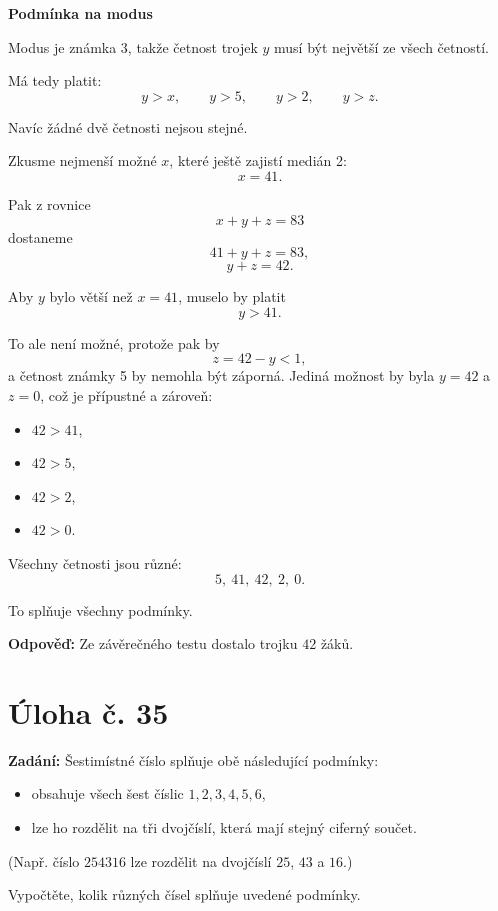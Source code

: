 \documentclass[12pt,a4paper]{article}
\begin{document}
\medskip

\textbf{Podmínka na modus}

Modus je známka \(3\), takže četnost trojek \(y\) musí být největší ze všech četností.

Má tedy platit:
\[
y>x,\qquad y>5,\qquad y>2,\qquad y>z.
\]

Navíc žádné dvě četnosti nejsou stejné.

\medskip

Zkusme nejmenší možné \(x\), které ještě zajistí medián 2:
\[
x=41.
\]

Pak z rovnice
\[
x+y+z=83
\]
dostaneme
\[
41+y+z=83,
\]
\[
y+z=42.
\]

Aby \(y\) bylo větší než \(x=41\), muselo by platit
\[
y>41.
\]

To ale není možné, protože pak by
\[
z=42-y<1,
\]
a četnost známky 5 by nemohla být záporná. Jediná možnost by byla \(y=42\) a \(z=0\), což je přípustné a zároveň:
\begin{itemize}
    \item \(42>41\),
    \item \(42>5\),
    \item \(42>2\),
    \item \(42>0\).
\end{itemize}

Všechny četnosti jsou různé:
\[
5,\ 41,\ 42,\ 2,\ 0.
\]

To splňuje všechny podmínky.

\bigskip

\textbf{Odpověď:}  
Ze závěrečného testu dostalo trojku \(42\) žáků.


\newpage
\section*{Úloha č. 35}

\textbf{Zadání:}  
Šestimístné číslo splňuje obě následující podmínky:
\begin{itemize}
    \item obsahuje všech šest číslic \(1,2,3,4,5,6\),
    \item lze ho rozdělit na tři dvojčíslí, která mají stejný ciferný součet.
\end{itemize}

(Např. číslo \(254316\) lze rozdělit na dvojčíslí \(25\), \(43\) a \(16\).)

Vypočtěte, kolik různých čísel splňuje uvedené podmínky.
\end{document}
